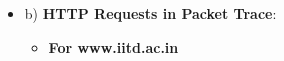 \documentclass{article}
\begin{document}
\begin{itemize}
\begin{itemize}
\begin{itemize}
        \end{itemize}
        \end{itemize}
    \item b) \textbf{HTTP Requests in Packet Trace}:
        \begin{itemize}
            \item \textbf{For www.iitd.ac.in}
\end{itemize}
\end{itemize}
\end{document}
